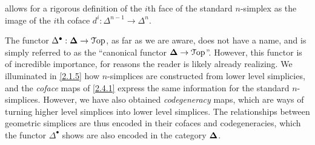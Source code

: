 \begin{remark}\label{2.4.5}
     allows for a rigorous definition of the $i$th face of the standard $n$-simplex as the image of the $i$th coface $d^i : \Delta^{n-1}\to\Delta^n$.
\end{remark}

The functor $\Delta^\bullet : \boldsymbol{\Delta}\to\mathcal{T}\mathrm{op}$, as far as we are aware, does not have a name, and is simply referred to as the ``canonical functor $\boldsymbol{\Delta}\to\mathcal{T}\mathrm{op}$''. However, this functor is of incredible importance, for reasons the reader is likely already realizing. We illuminated in \cref{2.1.5} how $n$-simplices are constructed from lower level simplicies, and the \emph{coface} maps of \cref{2.4.1} express the same information for the standard $n$-simplices. However, we have also obtained \emph{codegeneracy} maps, which are ways of turning higher level simplices into lower level simplices. The relationships between geometric simplices are thus encoded in their cofaces and codegeneracies, which the functor $\Delta^\bullet$ shows are also encoded in the category $\boldsymbol{\Delta}$.

